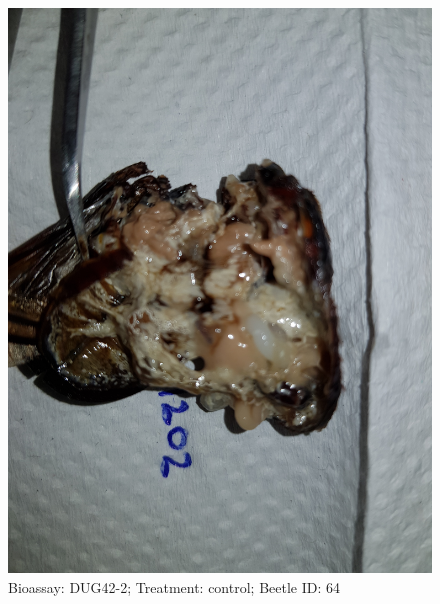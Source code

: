 \documentclass[11pt]{scrartcl}
\begin{document}
\begin{figure}[h!]
    \centering
    \includegraphics[width=\linewidth, height=\textheight, keepaspectratio]{uploads/btl.pm_image.9ac50522aea10415.447567343220313230325f5265702d3220636f6e74726f6c2e6a7067.jpg}
    \caption{Bioassay: DUG42-2; Treatment: control; Beetle ID: 64}
\end{figure}
\clearpage
\end{document}
